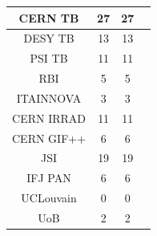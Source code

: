 \begin{table}[H]
\begin{tabularx}{\textwidth}{|c|c|c|K|}
  CERN TB &	27	& 27 &  \\ \hline
DESY TB	&13	&13&  \\ \hline
PSI TB	&11	&11&  \\ \hline
RBI	&5	&5&  \\ \hline
ITAINNOVA&	3&	3&  \\ \hline
CERN IRRAD	&11&	11&  \\ \hline
CERN GIF++	&6&	6&  \\ \hline
JSI	&19&	19&  \\ \hline
IFJ PAN	&6&	6&  \\ \hline
UCLouvain	&0&	0&  \\ \hline
UoB	&2&	2  &  \\ \hline

\end{tabularx}
\label{tab:ta-applications}
\end{table}


